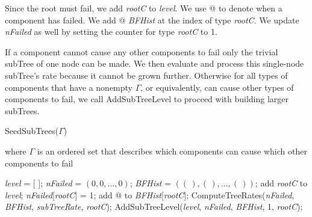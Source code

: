 \documentclass[12pt]{article}
\newcommand{\VARNAME}[1]{\textrm{\it#1}}
\begin{document}
Since the root must fail, we add \VARNAME{rootC} to \VARNAME{level}. We use @ to denote when a component has failed. We add @ \VARNAME{BFHist} at the index of type \VARNAME{rootC}. We update \VARNAME{nFailed} as well by setting the counter for type \VARNAME{rootC} to 1.         

If a component cannot cause any other components to fail only the trivial subTree of one node can be made. We then evaluate and process this single-node subTree's rate because it cannot be grown further. Otherwise for all types of components that have a nonempty $\Gamma$, or equivalently, can cause other types of components to fail, we call AddSubTreeLevel to proceed with building larger subTrees.    

\begin{algorithm}
\caption{SeedSubTrees($\Gamma$)}
\label{alg:SeedSubTrees}
where $\Gamma$ is an ordered set that describes which components can cause which other components to fail\\
\begin{algorithmic}[1]
\FOR{\VARNAME{rootC} $\in$ \VARNAME{compSet}}
  \STATE \VARNAME{level} = [ ]; 
  \STATE \VARNAME{nFailed} = $(0, 0, \ldots, 0)$; 
  \STATE \VARNAME{BFHist} = $ ((\,), (\,), \ldots, (\,)) $; 
  \STATE add \VARNAME{rootC} to \VARNAME{level};
  \STATE \VARNAME{nFailed}[\VARNAME{rootC}] = 1;
  \STATE add @ to \VARNAME{BFHist}[\VARNAME{rootC}]; 
  \IF{(Empty($\Gamma_{\VARNAME{rootC}}$))}
    \STATE ComputeTreeRates(\VARNAME{nFailed}, \VARNAME{BFHist}, \VARNAME{subTreeRate}, \VARNAME{rootC});
  \ELSE
    \STATE AddSubTreeLevel(\VARNAME{level}, \VARNAME{nFailed}, \VARNAME{BFHist}, 1, \VARNAME{rootC});
  \ENDIF
\ENDFOR
\end{algorithmic}
\end{algorithm}
\end{document}
